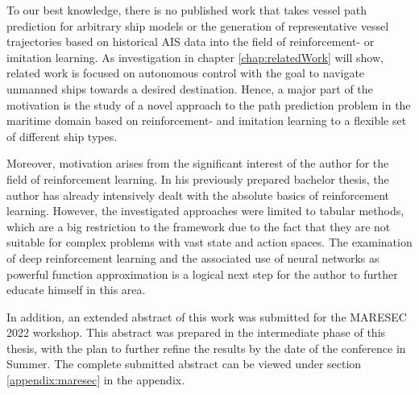 To our best knowledge, there is no published work that takes vessel path prediction for arbitrary ship models or the generation of representative vessel trajectories based on historical AIS data into the field of reinforcement- or imitation learning. As investigation in chapter \ref{chap:relatedWork} will show, related work is focused on autonomous control with the goal to navigate unmanned ships towards a desired destination. Hence, a major part of the motivation is the study of a novel approach to the path prediction problem in the maritime domain based on reinforcement- and imitation learning to a flexible set of different ship types.
\par
Moreover, motivation arises from the significant interest of the author for the field of reinforcement learning. In his previously prepared bachelor thesis, the author has already intensively dealt with the absolute basics of reinforcement learning.  However, the investigated approaches were limited to tabular methods, which are a big restriction to the framework due to the fact that they are not suitable for complex problems with vast state and action spaces. The examination of deep reinforcement learning and the associated use of neural networks as powerful function approximation is a logical next step for the author to further educate himself in this area.
\par
In addition, an extended abstract of this work was submitted for the MARESEC 2022 workshop. This abstract was prepared in the intermediate phase of this thesis, with the plan to further refine the results by the date of the conference in Summer. The complete submitted abstract can be viewed under section \ref{appendix:maresec} in the appendix.